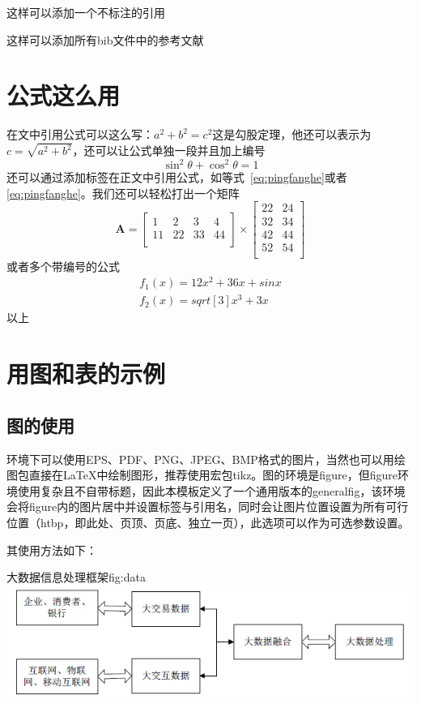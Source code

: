 \documentclass{HustGraduPaper}
\begin{document}
	这样可以添加一个不标注的引用\nocite{9787508342894}
	
	这样可以添加所有bib文件中的参考文献\nocite{*}
	
	\section{公式这么用}
	在文中引用公式可以这么写：$a^2+b^2=c^2$这是勾股定理，他还可以表示为$c=\sqrt{a^2+b^2}$，还可以让公式单独一段并且加上编号
	\begin{equation}
	\sin^2{\theta}+\cos^2{\theta}=1 \label{eq:pingfanghe}
	\end{equation}
	还可以通过添加标签在正文中引用公式，如等式~\eqref{eq:pingfanghe}或者\autoref{eq:pingfanghe}。我们还可以轻松打出一个矩阵
	\begin{equation}
	\bm{A}=\begin{bmatrix}
	1&2&3&4\\
	11&22&33&44\\
	\end{bmatrix}
	\times\begin{bmatrix}
	22&24\\
	32&34\\
	42&44\\
	52&54\\
	\end{bmatrix}
	\end{equation}
	或者多个带编号的公式
	\begin{eqnarray}
	f_1(x)=12x^2+36x+sinx\\
	f_2(x)=sqrt[3]{x^3+3x}
	\end{eqnarray}
	以上
	
	\section{用图和表的示例}
	\subsection{图的使用}
	\XeLaTeX 环境下可以使用EPS、PDF、PNG、JPEG、BMP格式的图片，当然也可以用绘图包直接在\LaTeX 中绘制图形，推荐使用宏包tikz。图的环境是figure，但figure环境使用复杂且不自带标题，因此本模板定义了一个通用版本的generalfig，该环境会将figure内的图片居中并设置标签与引用名，同时会让图片位置设置为所有可行位置（htbp，即此处、页顶、页底、独立一页），此选项可以作为可选参数设置。
	
	其使用方法如下：
	
	\begin{generalfig}[htb]{大数据信息处理框架}{fig:data}
		\includegraphics[width=\textwidth]{Figures/data.png}
	\end{generalfig}
	
\end{document}
